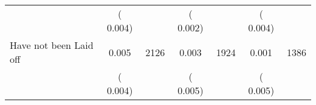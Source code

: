 \begin{tabular}{l*{6}{c}}
                       &       (       0.004)            &                               &       (       0.002)            &                               &       (       0.004)            &                               \\
Have not been Laid off        &              0.005      &       2126       &              0.003      &       1924       &              0.001      &       1386       \\
                       &       (       0.004)            &                               &       (       0.005)            &                               &       (       0.005)            &                               \\
\hline \end{tabular}